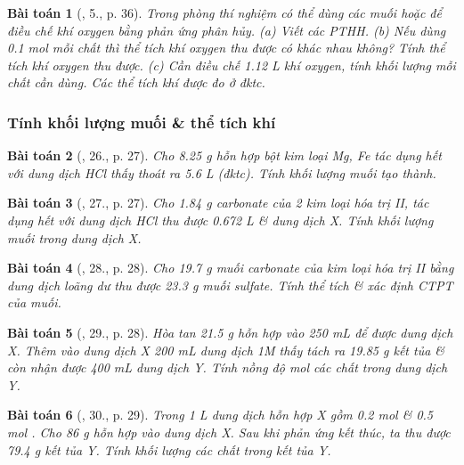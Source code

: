 \documentclass{article}
\newtheorem{baitoan}{Bài toán}
\begin{document}
\begin{baitoan}[\cite{SGK_Hoa_Hoc_9}, 5., p. 36]
	Trong phòng thí nghiệm có thể dùng các muối \emph{} hoặc \emph{} để điều chế khí oxygen bằng phản ứng phân hủy. (a) Viết các PTHH. (b) Nếu dùng \emph{0.1 mol} mỗi chất thì thể tích khí oxygen thu được có khác nhau không? Tính thể tích khí oxygen thu được. (c) Cần điều chế \emph{1.12 L} khí oxygen, tính khối lượng mỗi chất cần dùng. Các thể tích khí được đo ở đktc.
\end{baitoan}

\subsubsection{Tính khối lượng muối \& thể tích khí }

\begin{baitoan}[\cite{An_350_BT_Hoa_Hoc_9}, 26., p. 27]
	Cho \emph{8.25 g} hỗn hợp bột kim loại \emph{Mg, Fe} tác dụng hết với dung dịch \emph{HCl} thấy thoát ra \emph{5.6 L } (đktc). Tính khối lượng muối tạo thành.
\end{baitoan}

\begin{baitoan}[\cite{An_350_BT_Hoa_Hoc_9}, 27., p. 27]
	Cho \emph{1.84 g} carbonate của 2 kim loại hóa trị II, tác dụng hết với dung dịch \emph{HCl} thu được \emph{0.672 L } \& dung dịch X. Tính khối lượng muối trong dung dịch X.
\end{baitoan}

\begin{baitoan}[\cite{An_350_BT_Hoa_Hoc_9}, 28., p. 28]
	Cho \emph{19.7 g} muối carbonate của kim loại hóa trị II bằng dung dịch \emph{} loãng dư thu được \emph{23.3 g} muối sulfate. Tính thể tích \emph{} \& xác định CTPT của muối.
\end{baitoan}

\begin{baitoan}[\cite{An_350_BT_Hoa_Hoc_9}, 29., p. 28]
	Hòa tan \emph{21.5 g} hỗn hợp \emph{} vào \emph{250 mL } để được dung dịch X. Thêm vào dung dịch X \emph{200 mL} dung dịch \emph{ 1M} thấy tách ra \emph{19.85 g} kết tủa \& còn nhận được \emph{400 mL} dung dịch Y. Tính nồng độ mol các chất trong dung dịch Y.
\end{baitoan}

\begin{baitoan}[\cite{An_350_BT_Hoa_Hoc_9}, 30., p. 29]
	Trong \emph{1 L} dung dịch hỗn hợp X gồm \emph{0.2 mol } \& \emph{0.5 mol }. Cho \emph{86 g} hỗn hợp \emph{} vào dung dịch X. Sau khi phản ứng kết thúc, ta thu được \emph{79.4 g} kết tủa Y. Tính khối lượng các chất trong kết tủa Y.
\end{baitoan}
\end{document}
